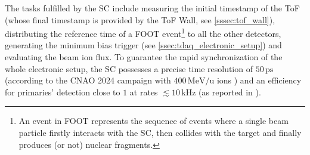The tasks fulfilled by the SC include measuring the initial timestamp of the ToF (whose final timestamp is provided by the ToF Wall, see \autoref{sssec:tof_wall}), distributing the reference time of a FOOT event\footnote{An event in FOOT represents the sequence of events where a single beam particle firstly interacts with the SC, then collides with the target and finally produces (or not) nuclear fragments.} to all the other detectors, generating the minimum bias trigger (see \autoref{ssec:tdaq_electronic_setup}) and evaluating the beam ion flux. To guarantee the rapid synchronization of the whole electronic setup, the SC possesses a precise time resolution of $50\,\mathrm{ps}$ (according to the CNAO 2024 campaign with $400\,\mathrm{MeV/u}$  ions \cite{UbaldiPhDThesis}) and an efficiency for primaries' detection close to $1$ at rates $\lesssim10\,\mathrm{kHz}$ (as reported in \cite{Haidar_2012}).
